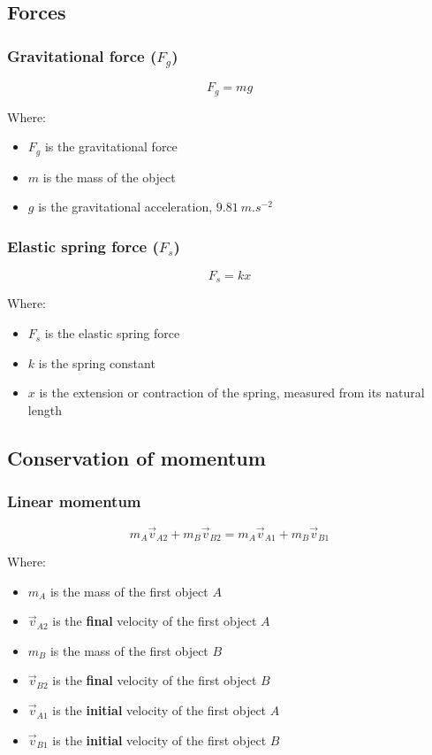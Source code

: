 \documentclass[11pt]{article}
\begin{document}
\subsection{Forces}
\label{sec:org421016f}

\subsubsection{Gravitational force (\(F_g\))}
\label{sec:org18c1492}
\[F_g = mg\]

Where:
\begin{itemize}
\item \(F_g\) is the gravitational force
\item \(m\) is the mass of the object
\item \(g\) is the gravitational acceleration, \(\qty{9.81}{m.s^{-2}}\)
\end{itemize}

\subsubsection{Elastic spring force (\(F_s\))}
\label{sec:org9cda8e4}
\[F_s = kx\]

Where:
\begin{itemize}
\item \(F_s\) is the elastic spring force
\item \(k\) is the spring constant
\item \(x\) is the extension or contraction of the spring, measured from its natural length
\end{itemize}

\subsection{Conservation of momentum}
\label{sec:org0d5cc9b}

\subsubsection{Linear momentum}
\label{sec:orga0c1b53}
\[m_A \vec{v}_{A2} + m_B \vec{v}_{B2} = m_A \vec{v}_{A1} + m_B \vec{v}_{B1}\]

Where:
\begin{itemize}
\item \(m_A\) is the mass of the first object \(A\)
\item \(\vec{v}_{A2}\) is the \textbf{final} velocity of the first object \(A\)
\item \(m_B\) is the mass of the first object \(B\)
\item \(\vec{v}_{B2}\) is the \textbf{final} velocity of the first object \(B\)
\item \(\vec{v}_{A1}\) is the \textbf{initial} velocity of the first object \(A\)
\item \(\vec{v}_{B1}\) is the \textbf{initial} velocity of the first object \(B\)
\end{itemize}
\end{document}
